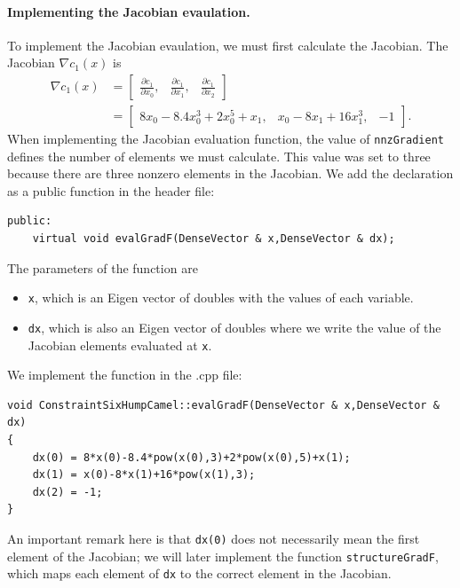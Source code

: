 \paragraph{Implementing the Jacobian evaulation.} To implement the Jacobian evaulation, we must first calculate the Jacobian. The Jacobian $\nabla c_1(x)$ is
\begin{align*}
\nabla c_1(x) &= \begin{bmatrix} \frac{\partial c_1}{\partial x_0}, & \frac{\partial c_1}{\partial x_1}, & \frac{\partial c_1}{\partial x_2} \end{bmatrix} \\
&= \begin{bmatrix} 8x_0 - 8.4x_0^3 + 2x_0^5 + x_1, & x_0 - 8x_1 + 16x_1^3, & -1 \end{bmatrix}.
\end{align*}
When implementing the Jacobian evaluation function, the value of \texttt{nnzGradient} defines the number of elements we must calculate. This value was set to three because there are three nonzero elements in the Jacobian. We add the declaration as a public function in the header file:
\begin{lstlisting}
public:
	virtual void evalGradF(DenseVector & x,DenseVector & dx);
\end{lstlisting}
The parameters of the function are
\begin{itemize}
\item
\texttt{x}, which is an Eigen vector of doubles with the values of each variable.
\item
\texttt{dx}, which is also an Eigen vector of doubles where we write the value of the Jacobian elements evaluated at \texttt{x}.
\end{itemize}
We implement the function in the .cpp file:
\begin{lstlisting}
void ConstraintSixHumpCamel::evalGradF(DenseVector & x,DenseVector & dx)
{
	dx(0) = 8*x(0)-8.4*pow(x(0),3)+2*pow(x(0),5)+x(1);
	dx(1) = x(0)-8*x(1)+16*pow(x(1),3);
	dx(2) = -1;
}
\end{lstlisting}
An important remark here is that \texttt{dx(0)} does not necessarily mean the first element of the Jacobian; we will later implement the function \texttt{structureGradF}, which maps each element of \texttt{dx} to the correct element in the Jacobian.

